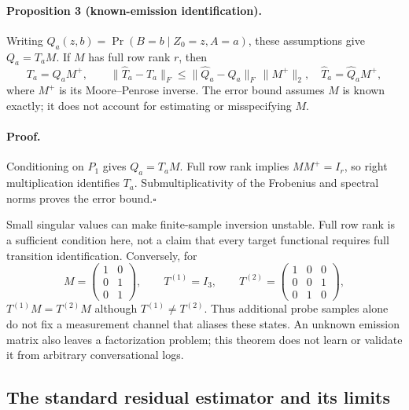 \paragraph{Proposition 3 (known-emission identification).}
Writing $Q_a(z,b)=\Pr(B=b\mid Z_0=z,A=a)$, these assumptions give
$Q_a=T_aM$. If $M$ has full row rank $r$, then
\begin{equation}
 T_a=Q_aM^+,\qquad
 \|\widehat T_a-T_a\|_F
 \leq\|\widehat Q_a-Q_a\|_F\,\|M^+\|_2,
 \quad \widehat T_a=\widehat Q_aM^+,
 \label{eq:theory:known-emission}
\end{equation}
where $M^+$ is its Moore--Penrose inverse. The error bound assumes $M$ is
known exactly; it does not account for estimating or misspecifying $M$.

\paragraph{Proof.}
Conditioning on $P_1$ gives $Q_a=T_aM$. Full row rank implies $MM^+=I_r$,
so right multiplication identifies $T_a$. Submultiplicativity of the
Frobenius and spectral norms proves the error bound.\hfill$\square$

Small singular values can make finite-sample inversion unstable. Full row
rank is a sufficient condition here, not a claim that every target functional
requires full transition identification. Conversely, for
\begin{equation}
 M=\begin{pmatrix}1&0\\0&1\\0&1\end{pmatrix},\qquad
 T^{(1)}=I_3,\qquad
 T^{(2)}=\begin{pmatrix}1&0&0\\0&0&1\\0&1&0\end{pmatrix},
\end{equation}
$T^{(1)}M=T^{(2)}M$ although $T^{(1)}\ne T^{(2)}$. Thus additional probe
samples alone do not fix a measurement channel that aliases these states.
An unknown emission matrix also leaves a factorization problem; this theorem
does not learn or validate it from arbitrary conversational logs.

\subsection{The standard residual estimator and its limits}
\label{app:theory:residual}


